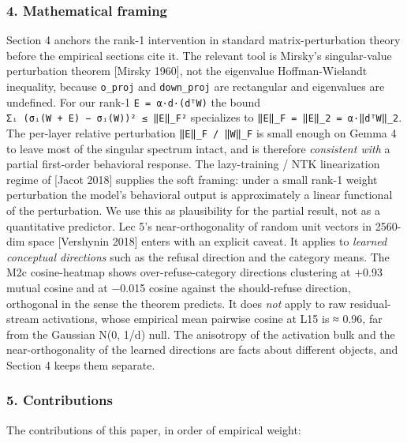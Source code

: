 \documentclass[
  11pt,
]{article}
\begin{document}
\subsubsection{4. Mathematical framing}\label{mathematical-framing}

Section 4 anchors the rank-1 intervention in standard
matrix-perturbation theory before the empirical sections cite it. The
relevant tool is Mirsky's singular-value perturbation theorem {[}Mirsky
1960{]}, not the eigenvalue Hoffman-Wielandt inequality, because
\texttt{o\_proj} and \texttt{down\_proj} are rectangular and eigenvalues
are undefined. For our rank-1 \texttt{E\ =\ α·d·(dᵀW)} the bound
\texttt{Σᵢ\ (σᵢ(W\ +\ E)\ −\ σᵢ(W))²\ ≤\ ‖E‖\_F²} specializes to
\texttt{‖E‖\_F\ =\ ‖E‖\_2\ =\ \textbar{}α\textbar{}·‖dᵀW‖\_2}. The
per-layer relative perturbation \texttt{‖E‖\_F\ /\ ‖W‖\_F} is small
enough on Gemma 4 to leave most of the singular spectrum intact, and is
therefore \emph{consistent with} a partial first-order behavioral
response. The lazy-training / NTK linearization regime of {[}Jacot
2018{]} supplies the soft framing: under a small rank-1 weight
perturbation the model's behavioral output is approximately a linear
functional of the perturbation. We use this as plausibility for the
partial result, not as a quantitative predictor. Lec 5's
near-orthogonality of random unit vectors in 2560-dim space {[}Vershynin
2018{]} enters with an explicit caveat. It applies to \emph{learned
conceptual directions} such as the refusal direction and the category
means. The M2c cosine-heatmap shows over-refuse-category directions
clustering at +0.93 mutual cosine and at −0.015 cosine against the
should-refuse direction, orthogonal in the sense the theorem predicts.
It does \emph{not} apply to raw residual-stream activations, whose
empirical mean pairwise cosine at L15 is ≈ 0.96, far from the Gaussian
N(0, 1/d) null. The anisotropy of the activation bulk and the
near-orthogonality of the learned directions are facts about different
objects, and Section 4 keeps them separate.

\subsubsection{5. Contributions}\label{contributions}

The contributions of this paper, in order of empirical weight:
\end{document}
